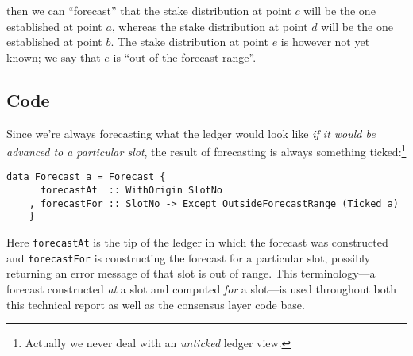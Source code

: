 \begin{center}
\end{center}
%
then we can ``forecast'' that the stake distribution at point $c$ will be the one
established at point $a$, whereas the stake distribution at point $d$ will be the
one established at point $b$. The stake distribution at point $e$ is however not
yet known; we say that $e$ is ``out of the forecast range''.

\subsection{Code}

Since we're always forecasting what the ledger would look like \emph{if it would
be advanced to a particular slot}, the result of forecasting is always something
ticked:\footnote{Actually we never deal with an \emph{unticked} ledger view.}
%
\begin{lstlisting}
data Forecast a = Forecast {
      forecastAt  :: WithOrigin SlotNo
    , forecastFor :: SlotNo -> Except OutsideForecastRange (Ticked a)
    }
\end{lstlisting}
%
Here \lstinline!forecastAt! is the tip of the ledger in which the forecast was
constructed and \lstinline!forecastFor! is constructing the forecast for a
particular slot, possibly returning an error message of that slot is out of
range. This terminology---a forecast constructed \emph{at} a slot
and computed \emph{for} a slot---is used throughout both this technical report
as well as the consensus layer code base.

